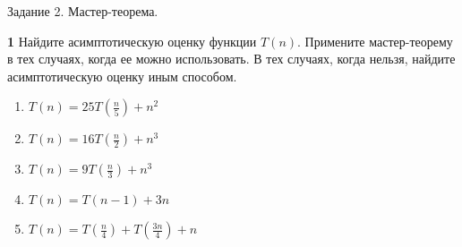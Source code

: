 \documentclass{article}
\begin{document}
\begin{center}
\Large {Задание 2. Мастер-теорема.}
\end{center}

\bigskip

\textbf{1} Найдите асимптотическую оценку функции $T(n)$. Примените мастер-теорему в тех случаях, когда ее можно использовать. В тех случаях, когда нельзя, найдите асимптотическую оценку иным способом.

\begin{enumerate}
    \item $T(n) = 25 T(\frac{n}{5}) + n^2$
    \item $T(n) = 16 T(\frac{n}{2}) + n^3$
    \item $T(n) = 9 T(\frac{n}{3}) + n^3$
    \item $T(n) = T(n-1) + 3n$
    \item $T(n) = T(\frac{n}{4}) + T(\frac{3n}{4}) + n$
\end{enumerate}
\end{document}
